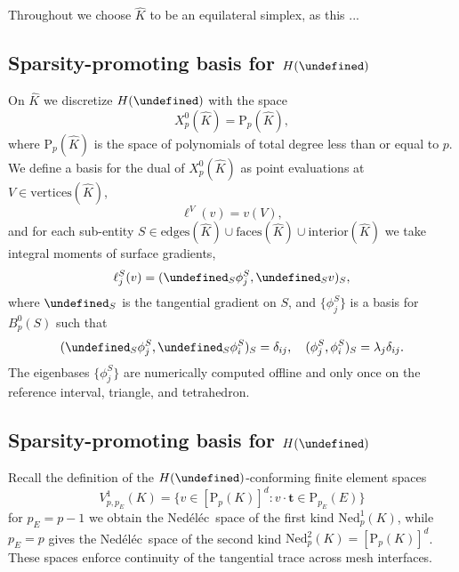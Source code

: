 \documentclass[review,onefignum,onetabnum,a4paper]{siamart190516}
\DeclareMathOperator*{\union}{\cup}
\let\grad\undefined
\let\curl\undefined
\DeclareMathOperator{\grad}{grad}
\DeclareMathOperator{\curl}{curl}
\newcommand{\Hgrad}{H(\grad)}
\newcommand{\Hcurl}{H(\curl)}
\renewcommand{\vec}[1]{\mathbf{#1}}
\newcommand{\bt}{\vec{t}}
\newcommand{\Khat}{\hat{K}}
\renewcommand{\P}{\mathrm{P}}
\newcommand{\Ned}{\mathrm{Ned}^{1}}
\newcommand{\NedTwo}{\mathrm{Ned}^{2}}
\newcommand{\Nedelec}{Ned\'el\'ec~}
\begin{document}
Throughout we choose $\Khat$ to be an equilateral simplex, as this ...

\subsection{Sparsity-promoting basis for $\Hgrad$}

On $\Khat$ we discretize $\Hgrad$ with the space
\begin{equation}
X^0_{p}(\Khat) = \P_p(\Khat),
\end{equation}
where $\P_p(\Khat)$ is the space of polynomials of total degree less than or equal to $p$.
We define a basis for the dual of $X^0_p(\Khat)$ as
point evaluations at $V \in \text{vertices}(\Khat)$,
\begin{equation}
   \ell^V(v) = v(V),
\end{equation}
and for each sub-entity $S \in \text{edges}(\Khat) \union \text{faces}(\Khat) \union \text{interior}(\Khat)$
we take integral moments of surface gradients, 
\begin{equation}
   \ell^S_j(v) = (\grad_S\phi^S_j, \grad_S v)_{S},
\end{equation}
where $\grad_S$ is the tangential gradient on $S$,
and $\{\phi^S_j\}$ is a basis for $B^0_p(S)$
such that
\begin{equation} \label{eq:hgrad-fdm}
   (\grad_S\phi^S_j, \grad_S\phi^S_i)_{S} = \delta_{ij}, \quad
   (\phi^S_j, \phi^S_i)_{S} = \lambda_j\delta_{ij}.
\end{equation}
The eigenbases $\{\phi^S_j\}$ are numerically computed offline and only once 
on the reference interval, triangle, and tetrahedron.


\subsection{Sparsity-promoting basis for $\Hcurl$}

Recall the definition of the $\Hcurl$-conforming finite element spaces
\begin{equation}
V^1_{p, p_E}(K) = \{v\in [\P_p(K)]^d : v\cdot\bt \in \P_{p_E}(E) \}
\end{equation}
for $p_E=p-1$ we obtain the \Nedelec space of the first kind $\Ned_p(K)$, while
$p_E=p$ gives the \Nedelec space of the second kind $\NedTwo_p(K) = [\P_p(K)]^d$. 
These spaces enforce continuity of the tangential trace across mesh interfaces.
\end{document}

